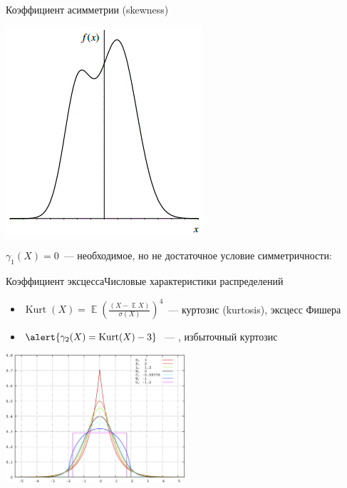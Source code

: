 \documentclass[11pt,pdf,utf8,hyperref={unicode},aspectratio=169]{beamer}
\DeclareMathOperator{\EE}{\mathbb{E}}
\DeclareMathOperator{\kurt}{Kurt}
\begin{document}
\begin{frame}{Коэффициент асимметрии (skewness)}{}

    \begin{center}
        \includegraphics[height=0.7\textheight]{Capture.png}
    \end{center}

    $\gamma_1(X)=0$~--- необходимое, но не достаточное условие симметричности:

\end{frame}
\begin{frame}{Коэффициент эксцесса}{Числовые характеристики распределений}
    \begin{itemize}
        \item $\kurt(X) =  \EE\left( \frac{(X-\EE{X})}{\sigma(X)}\right)^4$~--- куртозис (kurtosis),  эксцесс Фишера
        \item $\alert{\gamma_2(X) = \kurt(X)-3}$~--- , избыточный куртозис
    \end{itemize}
	\begin{center}
		\includegraphics[width=0.5\textwidth]{kurtosis.png}
	\end{center}
\end{frame}
\end{document}
